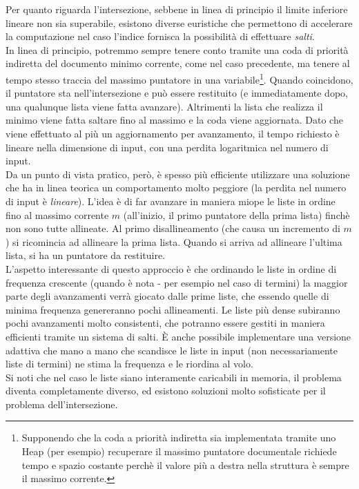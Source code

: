 Per quanto riguarda l'intersezione, sebbene in linea di principio il limite inferiore lineare non sia superabile, esistono diverse euristiche che permettono di accelerare la computazione nel caso l'indice fornisca la possibilità di effettuare \textit{salti}.\\
In linea di principio, potremmo sempre tenere conto tramite una coda di priorità indiretta del documento minimo corrente, come nel caso precedente, ma tenere al tempo stesso traccia del massimo puntatore in una variabile\footnote{Supponendo che la coda a priorità indiretta sia implementata tramite uno Heap (per esempio) recuperare il massimo puntatore documentale richiede tempo e spazio costante perchè il valore più a destra nella struttura è sempre il massimo corrente.}. Quando coincidono, il puntatore sta nell'intersezione e può essere restituito (e immediatamente dopo, una qualunque lista viene fatta avanzare). Altrimenti la lista che realizza il minimo viene fatta saltare fino al massimo e la coda viene aggiornata. Dato che viene effettuato al più un aggiornamento per avanzamento, il tempo richiesto è lineare nella dimensione di input, con una perdita logaritmica nel numero di input.\\
Da un punto di vista pratico, però, è spesso più efficiente utilizzare una soluzione che ha in linea teorica un comportamento molto peggiore (la perdita nel numero di input è \textit{lineare}). L'idea è di far avanzare in maniera miope le liste in ordine fino al massimo corrente $m$ (all'inizio, il primo puntatore della prima lista) finchè non sono tutte allineate. Al primo disallineamento (che causa un incremento di $m$) si ricomincia ad allineare la prima lista. Quando si arriva ad allineare l'ultima lista, si ha un puntatore da restituire.\\
L'aspetto interessante di questo approccio è che ordinando le liste in ordine di frequenza crescente (quando è nota - per esempio nel caso di termini) la maggior parte degli avanzamenti verrà giocato dalle prime liste, che essendo quelle di minima frequenza genereranno pochi allineamenti. Le liste più dense subiranno pochi avanzamenti molto consistenti, che potranno essere gestiti in maniera efficienti tramite un sistema di salti. È anche possibile implementare una versione adattiva che mano a mano che scandisce le liste in input (non necessariamente liste di termini) ne stima la frequenza e le riordina al volo.\\
Si noti che nel caso le liste siano interamente caricabili in memoria, il problema diventa completamente diverso, ed esistono soluzioni molto sofisticate per il problema dell'intersezione. %
